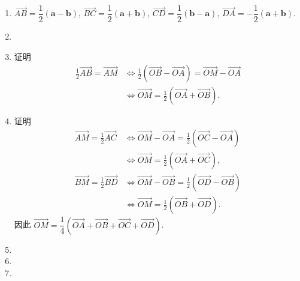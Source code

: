 \documentclass[a4paper, 11pt]{ctexart}
\begin{document}
\begin{enumerate}
    \item %
        $\overrightarrow{AB} = \dfrac12(\boldsymbol{a} - \boldsymbol{b})$,
        $\overrightarrow{BC} = \dfrac12(\boldsymbol{a} + \boldsymbol{b})$,
        $\overrightarrow{CD} = \dfrac12(\boldsymbol{b} - \boldsymbol{a})$,
        $\overrightarrow{DA} = -\dfrac12(\boldsymbol{a} + \boldsymbol{b})$.
    \item %
    
    \item %
        {\heiti 证明}\quad \begin{align*}
            \frac12\overrightarrow{AB} = \overrightarrow{AM}
            &\Leftrightarrow
            \frac12(\overrightarrow{OB} - \overrightarrow{OA}) = \overrightarrow{OM} - \overrightarrow{OA} \\
            &\Leftrightarrow
            \overrightarrow{OM} = \frac12(\overrightarrow{OA} + \overrightarrow{OB}).
        \end{align*}
    \item %
        {\heiti 证明}\quad \begin{align*}
            \overrightarrow{AM} = \frac12\overrightarrow{AC}
            &\Leftrightarrow
            \overrightarrow{OM} - \overrightarrow{OA} = \frac12(\overrightarrow{OC} - \overrightarrow{OA}) \\
            &\Leftrightarrow
            \overrightarrow{OM} = \frac12(\overrightarrow{OA} + \overrightarrow{OC}), \\
            \overrightarrow{BM} = \frac12\overrightarrow{BD}
            &\Leftrightarrow
            \overrightarrow{OM} - \overrightarrow{OB} = \frac12(\overrightarrow{OD} - \overrightarrow{OB}) \\
            &\Leftrightarrow
            \overrightarrow{OM} = \frac12(\overrightarrow{OB} + \overrightarrow{OD}).
        \end{align*}
        因此 $\overrightarrow{OM} = \dfrac14(\overrightarrow{OA} + \overrightarrow{OB} + \overrightarrow{OC} + \overrightarrow{OD})$.
    \item %
    \item %
    \item %
\end{enumerate}
\end{document}
